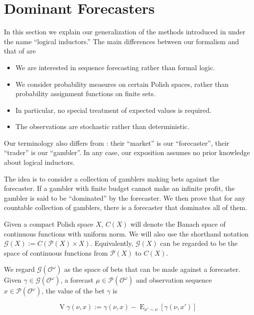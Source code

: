 \documentclass[11pt]{article}
\theoremstyle{definition}
\theoremstyle{plain}
\DeclareMathOperator{\E}{E}
\newcommand{\PM}{\mathcal{P}}
\newcommand{\Ob}{\mathcal{O}}
\newcommand{\OO}{\Ob^\omega}
\newcommand{\PMO}{\PM(\OO)}
\newcommand{\Gm}{\mathcal{G}}
\newcommand{\GMO}{\Gm(\OO)}
\DeclareMathOperator{\V}{V}
\begin{document}
\section{Dominant Forecasters}
\label{sec:garrabrant}

In this section we explain our generalization of the methods introduced in \cite{Garrabrant_2016} under the name \enquote{logical inductors.} The main differences between our formalism and that of \cite{Garrabrant_2016} are

\begin{itemize}
\item 
We are interested in sequence forecasting rather than formal logic.
\item
We consider probability measures on certain Polish spaces, rather than probability assignment functions on finite sets.
\item
In particular, no special treatment of expected values is required.
\item
The observations are stochastic rather than deterministic.
\end{itemize}

Our terminology also differs from \cite{Garrabrant_2016}: their \enquote{market} is our \enquote{forecaster}, their \enquote{trader} is our \enquote{gambler}. In any case, our exposition assumes no prior knowledge about logical inductors.

The idea is to consider a collection of gamblers making bets against the forecaster. If a gambler with finite budget cannot make an infinite profit, the gambler is said to be \enquote{dominated} by the forecaster. We then prove that for any countable collection of gamblers, there is a forecaster that dominates all of them.

Given a compact Polish space $X$, $C(X)$ will denote the Banach space of continuous functions with uniform norm. We will also use the shorthand notation $\Gm(X):=C(\PM(X) \times X)$. Equivalently, $\Gm(X)$ can be regarded to be the space of continuous functions from $\PM(X)$ to $C(X)$.

We regard $\GMO$ as the space of bets that can be made against a forecaster. Given $\gamma \in \GMO$, a forecast $\mu \in \PMO$ and observation sequence $x \in \PMO$, the value of the bet $\gamma$ is

\begin{equation}
\V{\gamma}(\nu,x):=\gamma(\nu,x) - \E_{x' \sim \nu}[\gamma(\nu,x')]
\end{equation}
\end{document}
